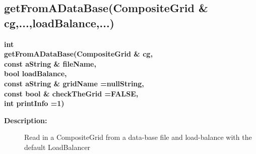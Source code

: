 \subsection{getFromADataBase(CompositeGrid \& cg,...,loadBalance,...)}
 
\newlength{\DataBaseAccessFunctionsIncludeArgIndent}
\begin{flushleft} \textbf{%
int  \\ 
\settowidth{\DataBaseAccessFunctionsIncludeArgIndent}{getFromADataBase(}%
getFromADataBase(CompositeGrid \& cg, \\ 
\hspace{\DataBaseAccessFunctionsIncludeArgIndent}const aString \& fileName, \\ 
\hspace{\DataBaseAccessFunctionsIncludeArgIndent}bool loadBalance, \\ 
\hspace{\DataBaseAccessFunctionsIncludeArgIndent}const aString \& gridName  =nullString,\\ 
\hspace{\DataBaseAccessFunctionsIncludeArgIndent}const bool \& checkTheGrid  =FALSE,\\ 
\hspace{\DataBaseAccessFunctionsIncludeArgIndent}int printInfo  =1)
}\end{flushleft}
\begin{description}
\item[{\bf Description:}] 
   Read in a CompositeGrid from a data-base file and load-balance with the default LoadBalancer
\end{description}
